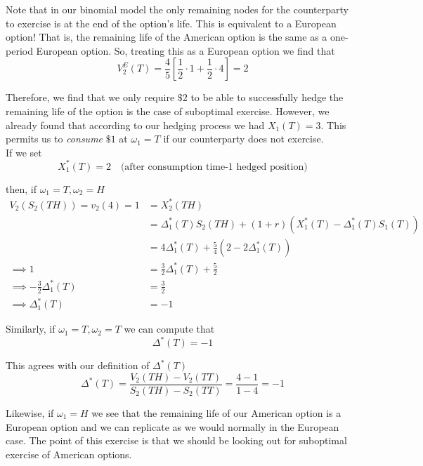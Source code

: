 \documentclass[12pt]{article}
\newlength\tindent
\renewcommand{\indent}{\hspace*{\tindent}}
\begin{document}
\indent Note that in our binomial model the only remaining nodes for the counterparty to exercise is at the end of the option's life. This is equivalent to a European option! That is, the remaining life of the American option is the same as a one-period European option. So, treating this as a European option we find that
\begin{equation*}
	V^E_2(T) = \frac{4}{5}\left[\frac{1}{2}\cdot 1 + \frac{1}{2}\cdot 4\right] = 2
\end{equation*}

\indent Therefore, we find that we only require $\$2$ to be able to successfully hedge the remaining life of the option is the case of suboptimal exercise. However, we already found that according to our hedging process we had $X_1(T) = 3$. This permits us to {\em consume} $\$1$ at $\omega_1 = T$ if our counterparty does not exercise. \\

If we set
\begin{equation*}
	X_1^*(T) = 2 \quad \text{(after consumption time-$1$ hedged position)}
\end{equation*}

then, if $\omega_1 = T, \omega_2 = H$
\begin{align*}
	V_2(S_2(TH)) = v_2(4) = 1 &= X_2^*(TH) \\
	&= \Delta_1^*(T)S_2(TH) + (1 + r)(X^*_1(T) - \Delta^*_1(T)S_1(T)) \\
	&= 4\Delta_1^*(T) + \frac{5}{4}(2 - 2\Delta^*_1(T)) \\
 \implies 1 &= \frac{3}{2}\Delta_1^*(T) + \frac{5}{2} \\
 \implies -\frac{3}{2}\Delta_1^*(T) &= \frac{3}{2} \\
 \implies \Delta_1^*(T) &= -1
\end{align*}

Similarly, if $\omega_1 = T, \omega_2 = T$ we can compute that
\begin{equation*}
	\Delta^*(T) = -1
\end{equation*}

This agrees with our definition of $\Delta^*(T)$
\begin{equation*}
	\Delta^*(T) = \frac{ V_2(TH) - V_2(TT) }{ S_2(TH) - S_2(TT)} = \frac{4 - 1}{1 - 4} = -1
\end{equation*}

\indent Likewise, if $\omega_1 = H$ we see that the remaining life of our American option is a European option and we can replicate as we would normally in the European case. The point of this exercise is that we should be looking out for suboptimal exercise of American options.
\end{document}

